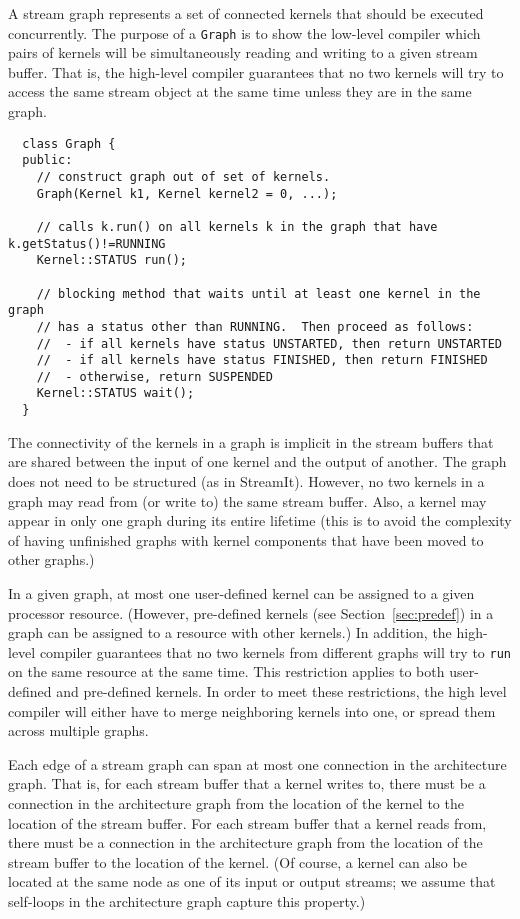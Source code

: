 A stream graph represents a set of connected kernels that should be
executed concurrently.  The purpose of a {\tt Graph} is to show the
low-level compiler which pairs of kernels will be simultaneously
reading and writing to a given stream buffer.  That is, the high-level
compiler guarantees that no two kernels will try to access the same
stream object at the same time unless they are in the same graph.
{\small
\begin{verbatim}
  class Graph {
  public:
    // construct graph out of set of kernels.
    Graph(Kernel k1, Kernel kernel2 = 0, ...);

    // calls k.run() on all kernels k in the graph that have k.getStatus()!=RUNNING
    Kernel::STATUS run();

    // blocking method that waits until at least one kernel in the graph 
    // has a status other than RUNNING.  Then proceed as follows:
    //  - if all kernels have status UNSTARTED, then return UNSTARTED
    //  - if all kernels have status FINISHED, then return FINISHED
    //  - otherwise, return SUSPENDED
    Kernel::STATUS wait();
  }
\end{verbatim}}
\noindent The connectivity of the kernels in a graph is implicit in
the stream buffers that are shared between the input of one kernel and
the output of another.  The graph does not need to be structured (as
in StreamIt).  However, no two kernels in a graph may read from (or
write to) the same stream buffer.  Also, a kernel may appear in only
one graph during its entire lifetime (this is to avoid the complexity
of having unfinished graphs with kernel components that have been
moved to other graphs.)

In a given graph, at most one user-defined kernel can be assigned to a
given processor resource.  (However, pre-defined kernels (see
Section~\ref{sec:predef}) in a graph can be assigned to a resource
with other kernels.)  In addition, the high-level compiler guarantees
that no two kernels from different graphs will try to {\tt run} on the
same resource at the same time.  This restriction applies to both
user-defined and pre-defined kernels.  In order to meet these
restrictions, the high level compiler will either have to merge
neighboring kernels into one, or spread them across multiple graphs.

Each edge of a stream graph can span at most one connection in the
architecture graph.  That is, for each stream buffer that a kernel
writes to, there must be a connection in the architecture graph from
the location of the kernel to the location of the stream buffer.  For
each stream buffer that a kernel reads from, there must be a
connection in the architecture graph from the location of the stream
buffer to the location of the kernel.  (Of course, a kernel can also
be located at the same node as one of its input or output streams; we
assume that self-loops in the architecture graph capture this
property.)

